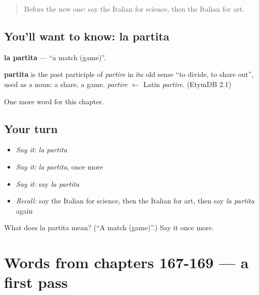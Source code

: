 \label{lesson:IT-C173-partita}



\begin{quote}
Before the new one: say the Italian for science, then the Italian for art.
\end{quote}

\subsection*{You'll want to know: la partita}
\textbf{la partita} — \textquotedblleft{}a match (game)\textquotedblright{}.

\begin{cousinweb}
\textbf{partita} is the past participle of \emph{partire} in its old sense \textquotedblleft{}to divide, to share out\textquotedblright{}, used as a noun: a share, a game. \emph{partire} $\leftarrow$ Latin \emph{partire}. (EtymDB 2.1)
\end{cousinweb}

\begin{grammarlens}[title={What you've built}]
One more word for this chapter.
\end{grammarlens}

\subsection*{Your turn}
\begin{itemize}
\raggedright
  \item \emph{Say it:} \emph{la partita}
  \item \emph{Say it:} \emph{la partita}, once more
  \item \emph{Say it:} say \emph{la partita}
  \item \emph{Recall:} say the Italian for science, then the Italian for art, then say \emph{la partita} again
\end{itemize}

\begin{tcolorbox}[breakable,colback=teal!4,colframe=teal!35!black,title={Before you move on}]
What does la partita mean? (\textquotedblleft{}A match (game)\textquotedblright{}.) Say it once more.
\end{tcolorbox}
\section[(dialogue)]{Words from chapters 167-169 — a first pass}

\label{lesson:IT-R173-first-pass-words-from-chapters-167-169}




